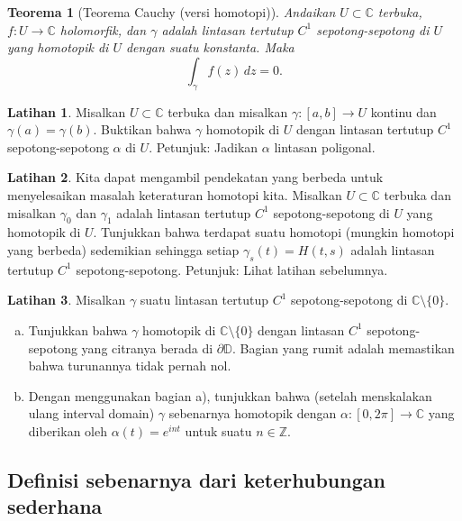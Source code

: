 \documentclass[12pt,openany]{book}
\newcommand{\C}{{\mathbb{C}}}
\newcommand{\Z}{{\mathbb{Z}}}
\newcommand{\D}{{\mathbb{D}}}
\theoremstyle{plain}
\newtheorem{thm}{Teorema}[section]
\theoremstyle{remark}
\theoremstyle{definition}
\newenvironment{exbox}{%
    \def\FrameCommand{\vrule width 1pt \relax\hspace{10pt}}%
    \MakeFramed{\advance\hsize-\width\FrameRestore}%
}{%
    \endMakeFramed
}
\newenvironment{exparts}{%
    \leavevmode\begin{enumerate}[a),noitemsep,topsep=0pt,parsep=0pt,partopsep=0pt]
}{%
    \end{enumerate}
}
\theoremstyle{exercise}
\newtheorem{exercise}{Latihan}[section]
\theoremstyle{example}
\begin{document}
\begin{thm}[Teorema Cauchy (versi homotopi)]
\label{thm:cauchyhomotopy}%
%
Andaikan $U \subset \C$ terbuka, $f \colon U \to \C$ holomorfik,
dan $\gamma$ adalah lintasan tertutup $C^1$ sepotong-sepotong di $U$ yang homotopik di $U$ dengan suatu
konstanta. Maka
\begin{equation*}
\int_{\gamma} f(z) \, dz = 0 .
\end{equation*}
\end{thm}

\begin{exbox}
\begin{exercise}
Misalkan $U \subset \C$ terbuka dan misalkan $\gamma \colon [a,b] \to U$ kontinu
dan $\gamma(a)=\gamma(b)$. Buktikan bahwa $\gamma$ homotopik di $U$
dengan lintasan tertutup $C^1$ sepotong-sepotong $\alpha$ di $U$.
Petunjuk: Jadikan $\alpha$ lintasan poligonal.
\end{exercise}

\begin{exercise}
Kita dapat mengambil pendekatan yang berbeda untuk menyelesaikan masalah keteraturan
homotopi kita. Misalkan
$U \subset \C$ terbuka dan misalkan $\gamma_0$ dan $\gamma_1$ adalah lintasan tertutup
$C^1$ sepotong-sepotong di $U$ yang homotopik di $U$.
Tunjukkan bahwa terdapat suatu homotopi (mungkin homotopi yang berbeda) sedemikian sehingga
setiap $\gamma_s(t) = H(t,s)$ adalah lintasan tertutup $C^1$ sepotong-sepotong.
Petunjuk: Lihat latihan sebelumnya.
\end{exercise}

\begin{exercise}
\pagebreak[2]
Misalkan $\gamma$ suatu lintasan tertutup $C^1$ sepotong-sepotong di $\C \setminus \{ 0 \}$.
\begin{exparts}
\item
Tunjukkan bahwa $\gamma$ homotopik di $\C \setminus \{ 0 \}$ dengan
lintasan $C^1$ sepotong-sepotong yang citranya berada di $\partial \D$.
Bagian yang rumit adalah memastikan bahwa turunannya tidak pernah nol.
\item
Dengan menggunakan bagian a),
tunjukkan bahwa (setelah menskalakan ulang interval domain) $\gamma$ sebenarnya homotopik dengan
$\alpha \colon [0,2\pi] \to \C$ yang diberikan oleh $\alpha(t) = e^{int}$ untuk suatu
$n \in \Z$.
\end{exparts}
\end{exercise}
\end{exbox}

\subsection{Definisi sebenarnya dari keterhubungan sederhana}
\end{document}
